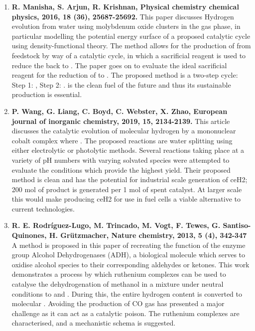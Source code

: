 \documentclass[a4paper]{article}
\begin{document}
	\begin{enumerate}
		\item \textbf{R. Manisha, S. Arjun, R. Krishnan, Physical chemistry chemical physics, 2016, 18 (36), 25687-25692.} This paper discusses Hydrogen evolution from water using molybdenum oxide clusters in the gas phase, in particular modelling the potential energy surface of a proposed catalytic cycle using density-functional theory. The method allows for the production of  from feedstock by way of a catalytic cycle, in which a sacrificial reagent is used to reduce the  back to . The paper goes on to evaluate the ideal sacrificial reagent for the reduction of  to . The proposed method is a two-step cycle: Step 1: , Step 2: .  is the clean fuel of the future and thus its sustainable production is essential.  
		\item \textbf{P. Wang, G. Liang, C. Boyd, C. Webster, X. Zhao, European journal of inorganic chemistry, 2019, 15, 2134-2139.} This article discusses the catalytic evolution of molecular hydrogen by a mononuclear cobalt complex \ce{[Co(N4 - Py)(H20)][(PF6)3]} where . The proposed reactions are water splitting using either electrolytic or photolytic methods. Several reactions taking place at a variety of pH numbers with varying solvated species were attempted to evaluate the conditions which provide the highest yield. Their proposed method is clean and has the potential for industrial scale generation of ce{H2}; 200 \si{\mole} of product is generated per 1 mol of spent catalyst. At larger scale this would make producing ce{H2} for use in fuel cells a viable alternative to current technologies. 
		\item \textbf{R. E. Rodríguez-Lugo, M. Trincado, M. Vogt, F. Tewes, G. Santiso-Quinones, H. Grützmacher, Nature chemistry, 2013, 5 (4), 342-347} A method is proposed in this paper of recreating the function of the enzyme group Alcohol Dehydrogenases (ADH), a biological molecule which serves to oxidise alcohol species to their corresponding aldehydes or ketones. This work demonstrates a process by which ruthenium complexes can be used to catalyse the dehydrogenation of methanol in a  mixture under neutral conditions to  and . During this, the entire hydrogen content is converted to molecular . Avoiding the production of CO gas has presented a major challenge as it can act as a catalytic poison. The ruthenium complexes are characterised, and a mechanistic schema is suggested.
	\end{enumerate}
	
\end{document}

